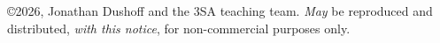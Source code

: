 \copyright 2026, Jonathan Dushoff and the 3SA teaching team.  \emph{May} be reproduced and distributed, \emph{with this notice}, for non-commercial purposes only.

